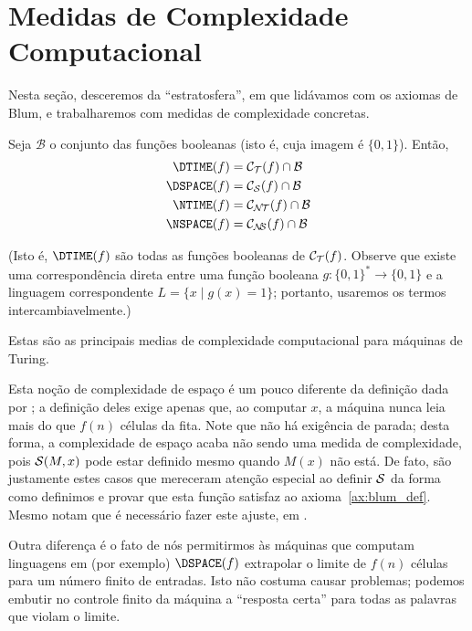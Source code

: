 \section{Medidas de Complexidade Computacional}
\label{sec:default_measures}

Nesta seção,
desceremos da ``estratosfera'',
em que lidávamos com os axiomas de Blum,
e trabalharemos com medidas de complexidade concretas.

\begin{provisionaldefinition}
    Seja $\mathcal B$ o conjunto das funções booleanas
    (isto é, cuja imagem é $\{0, 1\}$).
    Então,
    \begin{align*}
        \DTIME(f) &= \mathcal C_\PhiDT(f) \cap \mathcal B \\
        \DSPACE(f) &= \mathcal C_\PhiDS(f) \cap \mathcal B \\
        \NTIME(f) &= \mathcal C_\PhiNT(f) \cap \mathcal B \\
        \NSPACE(f) &= \mathcal C_\PhiNS(f) \cap \mathcal B
    \end{align*}
\end{provisionaldefinition}

(Isto é, $\DTIME(f)$ são todas as funções booleanas de $\mathcal C_{\mathcal{T}}(f)$.
Observe que existe uma correspondência direta entre
uma função booleana $g : \{0, 1\}^* \to \{0, 1\}$
e a linguagem correspondente $L = \{x \mid g(x) = 1\}$;
portanto,
usaremos os termos intercambiavelmente.)

Estas são as principais medias de complexidade computacional
para máquinas de Turing.

Esta noção de complexidade de espaço
é um pouco diferente da definição dada por
;
a definição deles exige apenas que,
ao computar $x$,
a máquina nunca leia mais do que $f(n)$ células da fita.
Note que não há exigência de parada;
desta forma,
a complexidade de espaço acaba não sendo uma medida de complexidade,
pois ${\mathcal{S}}(M, x)$ pode estar definido
mesmo quando $M(x)$ não está.
De fato,
são justamente estes casos que mereceram
atenção especial ao definir ${\mathcal{S}}$
da forma como definimos
e provar que esta função satisfaz ao axioma~\ref{ax:blum_def}.
Mesmo 
notam que é necessário fazer este ajuste,
em \cite[p.~313]{HopcroftUllman1979}.

Outra diferença é o fato de nós permitirmos
às máquinas que computam linguagens em
(por exemplo) $\DSPACE(f)$
extrapolar o limite de $f(n)$ células
para um número finito de entradas.
Isto não costuma causar problemas;
podemos embutir no controle finito da máquina
a ``resposta certa''
para todas as palavras que violam o limite.

